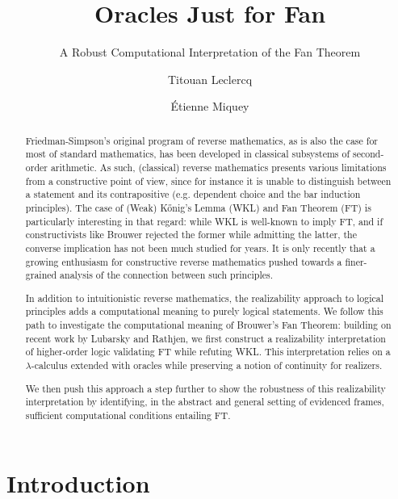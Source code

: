 \documentclass[a4paper,UKenglish,cleveref, autoref, thm-restate]{lipics-v2021}
\title{Oracles Just for Fan}
\subtitle{A Robust Computational Interpretation of the Fan Theorem}
\author{Titouan Leclercq}{Aix Marseille Université, CNRS, I2M, Marseille, France}{titouan.leclercq@univ-amu.fr	}{0009-0008-4423-442X}{}
\author{\'{E}tienne Miquey}{Aix Marseille Université, CNRS, I2M, Marseille, France}{etienne.miquey@univ-amu.fr	}{0000-0002-5987-6547}{}
\begin{document}
\maketitle

\begin{abstract}
 Friedman-Simpson’s original program of reverse mathematics,
as is also the case for most of standard mathematics,
has been developed in classical subsystems of second-order
arithmetic. As such, (classical) reverse mathematics
presents various limitations from a constructive point of view,
since for instance it is unable to distinguish between
a statement and its contrapositive (e.g. dependent choice and
the bar induction principles).
The case of (Weak) Kőnig's Lemma (WKL) and Fan Theorem (FT)
is particularly interesting in that regard:
while WKL is well-known to imply FT, and if constructivists like
Brouwer rejected the former while admitting the latter,
the converse implication has not been much studied for years.
It is only recently that a growing enthusiasm for constructive reverse
mathematics pushed towards a finer-grained analysis of the connection
between such principles.

In addition to intuitionistic reverse mathematics, the realizability approach to logical principles adds a computational meaning to purely logical statements. We follow this path to investigate the computational meaning of Brouwer's Fan Theorem: building on recent work by Lubarsky and Rathjen, we first construct a realizability interpretation of higher-order logic validating FT while refuting WKL. This interpretation relies on a $\lambda$-calculus extended with oracles while preserving a notion of continuity for realizers.

We then push this approach a step further to show the robustness of this realizability interpretation by identifying, in the abstract and general setting of evidenced frames, sufficient computational conditions entailing FT.
\end{abstract}


\section{Introduction}
\end{document}
